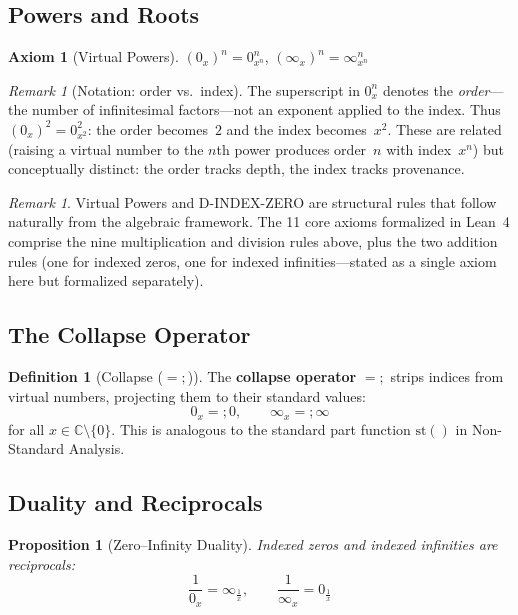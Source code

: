 \documentclass[12pt]{article}
\newtheorem{proposition}[theorem]{Proposition}
\theoremstyle{definition}
\newtheorem{definition}[theorem]{Definition}
\newtheorem{axiom}{Axiom}
\theoremstyle{remark}
\newtheorem{remark}[theorem]{Remark}
\newcommand{\vz}[1]{0_{#1}}             %
\newcommand{\vi}[1]{\infty_{#1}}        %
\newcommand{\vzn}[2]{0^{#1}_{#2}}       %
\newcommand{\vin}[2]{\infty^{#1}_{#2}}  %
\newcommand{\ceq}{\mathrel{=\!\!;}}     %
\newcommand{\C}{\mathbb{C}}
\begin{document}
\subsection{Powers and Roots}

\begin{axiom}[Virtual Powers]
$(\vz{x})^n = \vzn{n}{x^n}$, \quad $(\vi{x})^n = \vin{n}{x^n}$
\end{axiom}

\begin{remark}[Notation: order vs.\ index]
The superscript in $\vzn{n}{x}$ denotes the \emph{order}---the number
of infinitesimal factors---not an exponent applied to the index. Thus
$(\vz{x})^2 = \vzn{2}{x^2}$: the order becomes~$2$ and the index
becomes~$x^2$. These are related (raising a virtual number to the
$n$th power produces order~$n$ with index~$x^n$) but conceptually
distinct: the order tracks depth, the index tracks provenance.
\end{remark}

\begin{remark}
Virtual Powers and D-INDEX-ZERO are structural rules that follow
naturally from the algebraic framework. The 11 core axioms formalized
in Lean~4 comprise the nine multiplication and division rules above,
plus the two addition rules (one for indexed zeros, one for indexed
infinities---stated as a single axiom here but formalized separately).
\end{remark}

\subsection{The Collapse Operator}

\begin{definition}[Collapse ($\ceq$)]
The \textbf{collapse operator} $\ceq$ strips indices from virtual numbers,
projecting them to their standard values:
\[
\vz{x} \ceq 0, \qquad \vi{x} \ceq \infty
\]
for all $x \in \C \setminus \{0\}$. This is analogous to the standard part
function $\mathrm{st}()$ in Non-Standard Analysis.
\end{definition}

\subsection{Duality and Reciprocals}

\begin{proposition}[Zero--Infinity Duality]
Indexed zeros and indexed infinities are reciprocals:
\[
\frac{1}{\vz{x}} = \vi{\frac{1}{x}}, \qquad
\frac{1}{\vi{x}} = \vz{\frac{1}{x}}
\]
\end{proposition}
\end{document}
